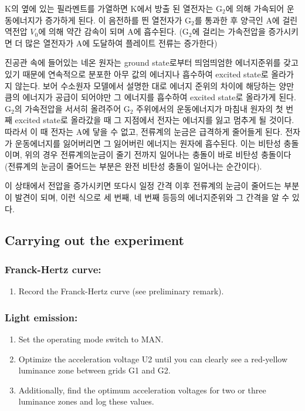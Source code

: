 \documentclass[a4paper, 10pt, nanum]{CSUniSchoolLabReport}
\begin{document}
	K의 옆에 있는 필라멘트를 가열하면 K에서 방출 된 열전자는 G$_2$에 의해 가속되어 운동에너지가 증가하게 된다. 이 음전하를 띈 열전자가 G$_2$를 통과한 후 양극인 A에 걸린 역전압 $V_0$에 의해 약간 감속이 되며 A에 흡수된다. (G$_2$에 걸리는 가속전압을 증가시키면 더 많은 열전자가 A에 도달하여 플레이트 전류는 증가한다)

	진공관 속에 들어있는 네온 원자는 ground state로부터 띄엄띄엄한 에너지준위를 갖고 있기 때문에 연속적으로 분포한 아무 값의 에너지나 흡수하여 excited state로 올라가지 않는다. 보어 수소원자 모델에서 설명한 대로 에너지 준위의 차이에 해당하는 양만큼의 에너지가 공급이 되어야만 그 에너지를 흡수하여 excited state로 올라가게 된다. G$_2$의 가속전압을 서서히 올려주어 G$_2$ 주위에서의 운동에너지가 마침내 원자의 첫 번째 excited state로 올라갔을 때 그 지점에서 전자는 에너지를 잃고 멈추게 될 것이다. 따라서 이 때 전자는 A에 닿을 수 없고, 전류계의 눈금은 급격하게 줄어들게 된다. 전자가 운동에너지를 잃어버리면 그 잃어버린 에너지는 원자에 흡수된다. 이는 비탄성 충돌이며, 위의 경우 전류계의눈금이 줄기 전까지 일어나는 충돌이 바로 비탄성 충돌이다(전류계의 눈금이 줄어드는 부분은 완전 비탄성 충돌이 일어나는 순간이다).

	이 상태에서 전압을 증가시키면 또다시 일정 간격 이후 전류계의 눈금이 줄어드는 부분이 발견이 되며, 이런 식으로 세 번째, 네 번째 등등의 에너지준위와 그 간격을 알 수 있다.


\subsection{Carrying out the experiment}

\subsubsection{Franck-Hertz curve:}
	\begin{enumerate}[label=\arabic*.]
		\item Record the Franck-Hertz curve (see preliminary remark). 
	\end{enumerate}

\subsubsection{Light emission:}
	\begin{enumerate}[label=\arabic*.]
		\item Set the operating mode switch to MAN. 
		\item Optimize the acceleration voltage U2 until you can clearly see a red-yellow luminance zone between grids G1 and G2. 
		\item Additionally, find the optimum acceleration voltages for two or three luminance zones and log these values. 
	\end{enumerate}
\end{document}
